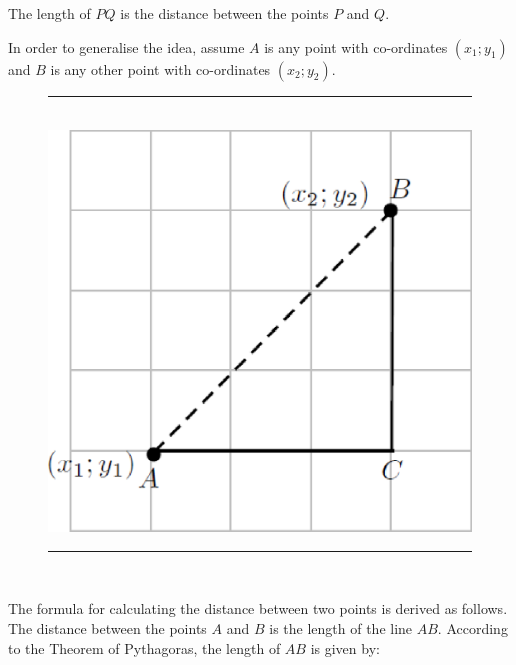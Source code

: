         \label{m39107*id67090}The length of \begin{math}PQ\end{math} is the distance between the points \begin{math}P\end{math} and \begin{math}Q\end{math}.\par 
        \label{m39107*id67126}In order to generalise the idea, assume \begin{math}A\end{math} is any point with co-ordinates \begin{math}\left({x}_{1};{y}_{1}\right)\end{math} and \begin{math}B\end{math} is any other point with co-ordinates \begin{math}\left({x}_{2};{y}_{2}\right)\end{math}.\par 
    \setcounter{subfigure}{0}
	\begin{figure}[H] %
    \begin{center}
    \rule[.1in]{\figurerulewidth}{.005in} \\
        \label{m39107*uid39!!!underscore!!!media}\label{m39107*uid39!!!underscore!!!printimage}\includegraphics[width=0.5\columnwidth]{col11306.imgs/m39107_MG10C14_016.png} %
      \vspace{2pt}
    \vspace{.1in}
    \rule[.1in]{\figurerulewidth}{.005in} \\
    \end{center}
 \end{figure}       
        \label{m39107*id67214}The formula for calculating the distance between two points is derived as follows. The distance between the points \begin{math}A\end{math} and \begin{math}B\end{math} is the length of the line \begin{math}AB\end{math}. According to the Theorem of Pythagoras, the length of \begin{math}AB\end{math} is given by:\par 
